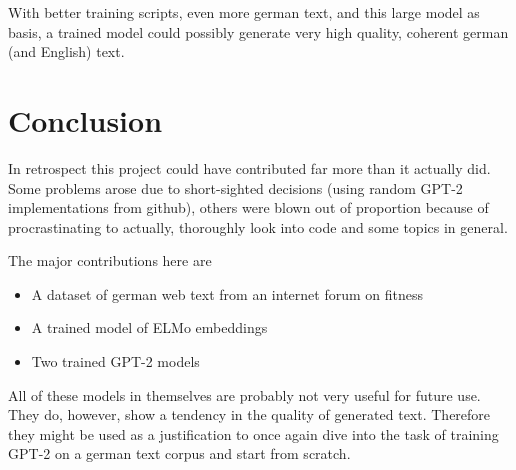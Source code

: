 \documentclass{scrartcl}
\begin{document}
With better training scripts, even more german text, and this large model as basis, a trained model could possibly generate very high quality, coherent german (and English) text.


\section{Conclusion}
In retrospect this project could have contributed far more than it actually did. Some problems arose due to short-sighted decisions (using random GPT-2 implementations from github), others were blown out of proportion because of procrastinating to actually, thoroughly look into code and some topics in general.

The major contributions here are 
\begin{itemize}
	\item A dataset of german web text from an internet forum on fitness
	\item A trained model of ELMo embeddings
	\item Two trained GPT-2 models
\end{itemize}

All of these models in themselves are probably not very useful for future use. They do, however, show a tendency in the quality of generated text. Therefore they might be used as a justification to once again dive into the task of training GPT-2 on a german text corpus and start from scratch.

 
%
%
%

\printbibliography
\end{document}
